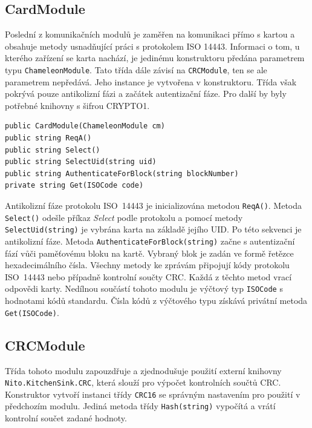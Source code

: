 \subsection*{CardModule}
Poslední z komunikačních modulů je zaměřen na komunikaci  přímo s kartou a obsahuje metody usnadňující práci s protokolem ISO 14443. Informaci o tom, u kterého zařízení se karta nachází, je jedinému konstruktoru předána parametrem typu \verb|ChameleonModule|. Tato třída dále závisí na \verb|CRCModule|, ten se ale parametrem nepředává. Jeho instance je vytvořena v konstruktoru. Třída však pokrývá pouze antikolizní fázi a začátek autentizační fáze. Pro další by byly potřebné knihovny s šifrou CRYPTO1. 
\begin{lstlisting}[caption=Metody třídy \emph{CardModule}, label={cardModuleMethods}]
public CardModule(ChameleonModule cm)
public string ReqA()
public string Select()
public string SelectUid(string uid)
public string AuthenticateForBlock(string blockNumber)
private string Get(ISOCode code)
\end{lstlisting}

Antikolizní fáze protokolu ISO~14443 je inicializována metodou \verb|ReqA()|. Metoda \verb|Select()| odešle příkaz \emph{Select} podle protokolu a pomocí metody \verb|SelectUid(string)| je vybrána karta na základě jejího UID. Po této sekvenci je antikolizní fáze. Metoda \verb|AuthenticateForBlock(string)| začne s autentizační fází vůči paměťovému bloku na kartě. Vybraný blok je zadán ve formě řetězce hexadecimálního čísla. Všechny metody ke zprávám připojují kódy protokolu ISO~14443 nebo případně kontrolní součty CRC. Každá z těchto metod vrací odpovědi karty. Nedílnou součástí tohoto modulu je výčtový typ \verb|ISOCode| s hodnotami kódů standardu. Čísla kódů z výčtového typu získává privátní metoda \verb|Get(ISOCode)|.

\subsection*{CRCModule}
Třída tohoto modulu zapouzdřuje a zjednodušuje použití externí knihovny \verb|Nito.KitchenSink.CRC|\footnotemark, která slouží pro výpočet kontrolních součtů CRC. Konstruktor vytvoří instanci třídy \verb|CRC16| se správným nastavením pro použití v předchozím modulu. Jediná metoda třídy \verb|Hash(string)| vypočítá a vrátí kontrolní součet zadané hodnoty. 


